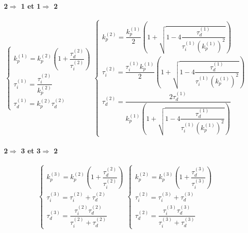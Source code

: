 \paragraph{2$\Rightarrow$ 1 et 1$\Rightarrow$ 2}
\[
\begin{cases}
    k_p^{(1)}=k_p^{(2)}\left(
              1+\dfrac{\tau_d^{(2)}}{\tau_i^{(2)}}\right)\\[1.0em]
    \tau_i^{(1)}=\dfrac{\tau_i^{(2)}}{k_p^{(2)}}\\[1.0em]
    \tau_d^{(1)}=k_p^{(2)}\tau_d^{(2)}
\end{cases}
\begin{cases}
k_p^{(2)}=
\dfrac{k_p^{(1)}}{2}\left(1+\sqrt{1-4\dfrac{\tau_d^{(1)}}{\tau_i^{(1)}(k_p^{(1)})^2}}\right)
\\[1.2em]

\tau_i^{(2)} = 
\dfrac{\tau_i^{(1)}k_p^{(1)}}{2}\left(1+\sqrt{1-4\dfrac{\tau_d^{(1)}}{\tau_i^{(1)}(k_p^{(1)})^2}}\right)\\[1.2em]

\tau_d^{(2)} = \dfrac{2\tau_d^{(1)}}{k_p^{(1)}\left(1+\sqrt{1-4\dfrac{\tau_d^{(1)}}{\tau_i^{(1)}(k_p^{(1)})^2}}\right)}
\end{cases}
\]
\paragraph{2$\Rightarrow$ 3 et 3$\Rightarrow$ 2}
\[
\begin{cases}
    k_p^{(3)}=k_p^{(2)}\left(
              1+\dfrac{\tau_d^{(2)}}{\tau_i^{(2)}}\right)\\[1.0em]
    \tau_i^{(3)}=\tau_i^{(2)}+\tau_d^{(2)}\\[1.0em]
    \tau_d^{(3)}=\dfrac{\tau_i^{(2)}\tau_d^{(2)}}{\tau_i^{(2)}+\tau_d^{(2)}}
\end{cases}
\begin{cases}
    k_p^{(2)}=k_p^{(3)}\left(
              1+\dfrac{\tau_d^{(3)}}{\tau_i^{(3)}}\right)\\[1.0em]
    \tau_i^{(2)}=\tau_i^{(3)}+\tau_d^{(3)}\\[1.0em]
    \tau_d^{(2)}=\dfrac{\tau_i^{(3)}\tau_d^{(3)}}{\tau_i^{(3)}+\tau_d^{(3)}}
\end{cases}
\]
